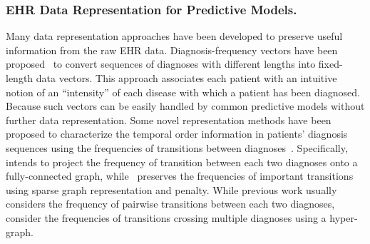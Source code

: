 \subsubsection{EHR Data Representation for Predictive Models. } 

 
Many data representation approaches have been developed to preserve useful information from the raw EHR data.
Diagnosis-frequency vectors have been proposed~\cite{ng_personalized_2015,huang_toward_2014} to convert sequences of diagnoses with different lengths into fixed-length data vectors.
This approach associates each patient with an intuitive notion of an ``intensity'' of each disease with which a patient has been diagnosed.
Because such vectors can be easily handled by common predictive models without further data representation.
Some novel representation methods have been proposed to characterize the temporal order information in patients' diagnosis sequences using the frequencies of transitions between diagnoses~\cite{zhang_mseq_2015,wang_towards_2012,liu_temporal_2015,gotz_methodology_2014,perer_frequence:_2014,perer_mining_2015}.
Specifically,~\cite{zhang_mseq_2015} intends to project the frequency of transition between each two diagnoses onto a fully-connected graph, while~\cite{liu_temporal_2015} preserves the frequencies of important transitions using sparse graph representation and penalty.
While previous work usually considers the frequency of pairwise transitions between each two diagnoses,~\cite{gotz_methodology_2014,perer_frequence:_2014,perer_mining_2015} consider the frequencies of transitions crossing multiple diagnoses using a hyper-graph.


